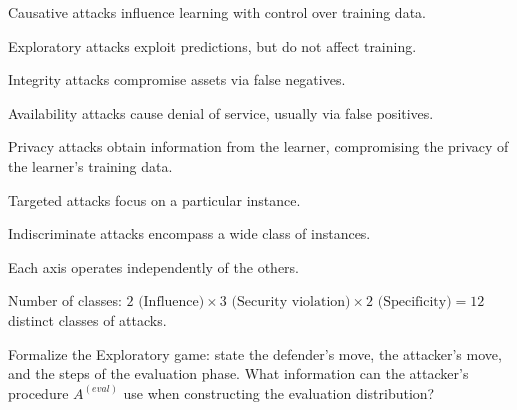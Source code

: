 \documentclass[10pt]{extarticle}
\newcommand{\resposta}[1]{\par\smallskip\noindent #1}
\begin{document}
\begin{questoes}
\resposta{
\begin{topicos}
\item[INFLUENCE:]
  \begin{topicos}
  \item Causative attacks influence learning with control over training data.
  \item Exploratory attacks exploit predictions, but do not affect training.
  \end{topicos}
\item[SECURITY VIOLATION:]
  \begin{topicos}
  \item Integrity attacks compromise assets via false negatives.
  \item Availability attacks cause denial of service, usually via false positives.
  \item Privacy attacks obtain information from the learner, compromising the privacy of the learner's training data.
  \end{topicos}
\item[SPECIFICITY:]
  \begin{topicos}
  \item Targeted attacks focus on a particular instance.
  \item Indiscriminate attacks encompass a wide class of instances.
  \end{topicos}
\item Each axis operates independently of the others.
\item Number of classes: $2 \text{ (Influence)} \times 3 \text{ (Security violation)} \times 2 \text{ (Specificity)} = 12$ distinct classes of attacks.
\end{topicos}
}

\item Formalize the Exploratory game: state the defender's move, the attacker's move, and the steps of the evaluation phase. What information can the attacker's procedure $A^{(eval)}$ use when constructing the evaluation distribution?


\end{questoes}
\end{document}
